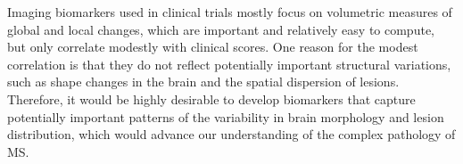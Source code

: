 Imaging biomarkers used in clinical trials mostly focus on volumetric measures
of global and local changes, which are important and relatively easy to compute,
but only correlate modestly with clinical scores. One reason for the modest
correlation is that they do not reflect potentially important structural
variations, such as shape changes in the brain and the spatial dispersion of
lesions. Therefore, it would be highly desirable to develop biomarkers that
capture potentially important patterns of the variability in brain morphology
and lesion distribution, which would advance our understanding of the complex
pathology of MS.

%
% 
% 
% 
% 
% 

